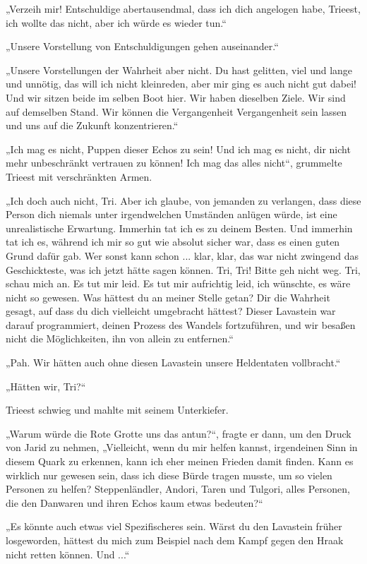„Verzeih mir! Entschuldige abertausendmal, dass ich dich angelogen habe, Trieest, ich wollte das nicht, aber ich würde es wieder tun.“

„Unsere Vorstellung von Entschuldigungen gehen auseinander.“

„Unsere Vorstellungen der Wahrheit aber nicht. Du hast gelitten, viel und lange und unnötig, das will ich nicht kleinreden, aber mir ging es auch nicht gut dabei! Und wir sitzen beide im selben Boot hier. Wir haben dieselben Ziele. Wir sind auf demselben Stand. Wir können die Vergangenheit Vergangenheit sein lassen und uns auf die Zukunft konzentrieren.“

„Ich mag es nicht, Puppen dieser Echos zu sein! Und ich mag es nicht, dir nicht mehr unbeschränkt vertrauen zu können! Ich mag das alles nicht“, grummelte Trieest mit verschränkten Armen.

„Ich doch auch nicht, Tri. Aber ich glaube, von jemanden zu verlangen, dass diese Person dich niemals unter irgendwelchen Umständen anlügen würde, ist eine unrealistische Erwartung. Immerhin tat ich es zu deinem Besten. Und immerhin tat ich es, während ich mir so gut wie absolut sicher war, dass es einen guten Grund dafür gab. Wer sonst kann schon ... klar, klar, das war nicht zwingend das Geschickteste, was ich jetzt hätte sagen können. Tri, Tri! Bitte geh nicht weg. Tri, schau mich an. Es tut mir leid. Es tut mir aufrichtig leid, ich wünschte, es wäre nicht so gewesen. Was hättest du an meiner Stelle getan? Dir die Wahrheit gesagt, auf dass du dich vielleicht umgebracht hättest? Dieser Lavastein war darauf programmiert, deinen Prozess des Wandels fortzuführen, und wir besaßen nicht die Möglichkeiten, ihn von allein zu entfernen.“

„Pah. Wir hätten auch ohne diesen Lavastein unsere Heldentaten vollbracht.“

„Hätten wir, Tri?“

Trieest schwieg und mahlte mit seinem Unterkiefer.

„Warum würde die Rote Grotte uns das antun?“, fragte er dann, um den Druck von Jarid zu nehmen, „Vielleicht, wenn du mir helfen kannst, irgendeinen Sinn in diesem Quark zu erkennen, kann ich eher meinen Frieden damit finden. Kann es wirklich nur gewesen sein, dass ich diese Bürde tragen musste, um so vielen Personen zu helfen? Steppenländler, Andori, Taren und Tulgori, alles Personen, die den Danwaren und ihren Echos kaum etwas bedeuten?“

„Es könnte auch etwas viel Spezifischeres sein. Wärst du den Lavastein früher losgeworden, hättest du mich zum Beispiel nach dem Kampf gegen den Hraak nicht retten können. Und ...“

